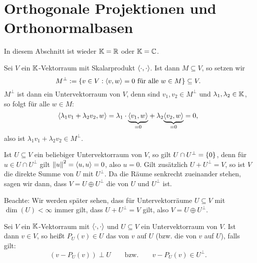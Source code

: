 \section{Orthogonale Projektionen und Orthonormalbasen}
\label{sec:2.4}

In diesem Abschnitt ist wieder $\mathbb{K} = \mathbb{R}$ oder $\mathbb{K}= \mathbb{C}$.

\begin{definition}
	\label{def:4.1}
	Sei $V$ ein $\mathbb{K}$-Vektorraum mit Skalarprodukt $\left\langle\cdot,\cdot\right\rangle$.
	Ist dann $M \subseteq V$, so setzen wir 
	\[
		M^\perp := \{v \in V : \left\langle v,w\right\rangle = 0 \text{ für alle } w \in M\} \subseteq V.
	\]
	$M^\perp$ ist dann ein Untervektorraum von $V$, denn sind $v_1,v_2 \in M^\perp$ und $\lambda_1,\lambda_2 \in \mathbb{K}$, so folgt für alle $w \in M$:
	\[
		\left\langle\lambda_1 v_1 + \lambda_2 v_2, w\right\rangle = \lambda_1 \cdot {\underbrace{\left\langle v_1,w\right\rangle}_{=0}} + \lambda_2 {\underbrace{\left\langle v_2,w\right\rangle}_{=0}} = 0,
	\]
	also ist $\lambda_1 v_1 + \lambda_2 v_2 \in M^\perp$.
\end{definition}

\begin{bemerkung}
	\label{bem:4.2}
	Ist $U \subseteq V$ ein beliebiger Untervektorraum von $V$, so gilt $U \cap U^\perp = \{0\}$, denn für $u \in U \cap U^\perp$ gilt $\left\lVert u\right\rVert^2 = \left\langle u,u\right\rangle = 0$, also $u = 0$.
	Gilt zusätzlich $U + U^\perp = V$, so ist $V$ die direkte Summe von $U$ mit $U^\perp$.
	Da die Räume senkrecht zueinander stehen, sagen wir dann, dass $V = U \oplus U^\perp$ die  von $U$ und $U^\perp$ ist.
	
	Beachte: Wir werden später sehen, dass für Untervektorräume $U \subseteq V$ mit $\dim(U) < \infty$ immer gilt, dass $U + U^\perp = V$ gilt, also $V = U \oplus U^\perp$.
\end{bemerkung}

\begin{definition}
	\label{def:4.3}
	Sei $V$ ein $\mathbb{K}$-Vektorraum mit $\left\langle\cdot,\cdot\right\rangle$ und $U \subseteq V$ ein Untervektorraum von $V$.
	Ist dann $v \in V$, so heißt $P_U(v) \in U$ das  von $v$ auf $U$ (bzw. die  von $v$ auf $U$), falls gilt:
	\[
	(v- P_U(v)) \perp U \qquad \text{bzw.} \qquad v-P_U(v) \in U^\perp.
	\]
\end{definition}

